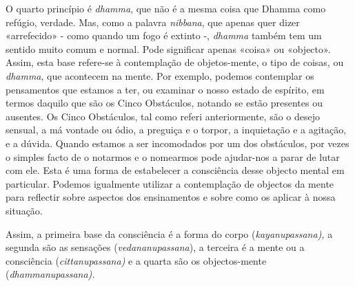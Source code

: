 O quarto princípio é \emph{dhamma}, que não é a mesma coisa que Dhamma
como refúgio, verdade. Mas, como a palavra \emph{nibbana}, que apenas
quer dizer «arrefecido» - como quando um fogo é extinto -, \emph{dhamma}
também tem um sentido muito comum e normal. Pode significar apenas
«coisa» ou «objecto». Assim, esta base refere-se à contemplação de
objetos-mente, o tipo de coisas, ou \emph{dhamma}, que acontecem na
mente. Por exemplo, podemos contemplar os pensamentos que estamos a ter,
ou examinar o nosso estado de espírito, em termos daquilo que são os
Cinco Obstáculos, notando se estão presentes ou ausentes. Os Cinco
Obstáculos, tal como referi anteriormente, são o desejo sensual, a má
vontade ou ódio, a preguiça e o torpor, a inquietação e a agitação, e a
dúvida. Quando estamos a ser incomodados por um dos obstáculos, por
vezes o simples facto de o notarmos e o nomearmos pode ajudar-nos a
parar de lutar com ele. Esta é uma forma de estabelecer a consciência
desse objecto mental em particular. Podemos igualmente utilizar a
contemplação de objectos da mente para reflectir sobre aspectos dos
ensinamentos e sobre como os aplicar à nossa situação.

Assim, a primeira base da consciência é a forma do corpo
(\emph{kayanupassana),} a segunda são as sensações
(\emph{vedananupassana}), a terceira é a mente ou a consciência
(\emph{cittanupassana)} e a quarta são os objectos-mente
(\emph{dhammanupassana).}
